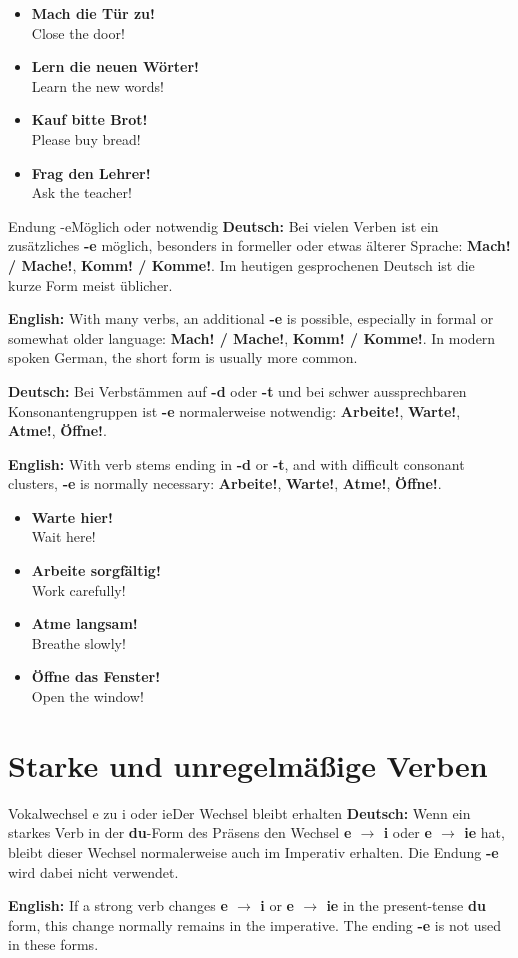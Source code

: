 \documentclass[a4paper,11pt]{article}
\newcommand{\GermanText}[1]{\textbf{Deutsch: }#1\par}
\newcommand{\EnglishText}[1]{{\small\color{SoftGray}\textbf{English: }#1\par}}
\newcommand{\ExampleItem}[2]{\item \textbf{#1}\\{\small\color{SoftGray}#2}}
\begin{document}
        \begin{exbox}
            \begin{itemize}
                \ExampleItem{Mach die Tür zu!}{Close the door!}
                \ExampleItem{Lern die neuen Wörter!}{Learn the new words!}
                \ExampleItem{Kauf bitte Brot!}{Please buy bread!}
                \ExampleItem{Frag den Lehrer!}{Ask the teacher!}
            \end{itemize}
        \end{exbox}

        \begin{grammarentry}{Endung -e}{Möglich oder notwendig}
            \GermanText{Bei vielen Verben ist ein zusätzliches \textbf{-e} möglich, besonders in formeller oder etwas älterer Sprache: \textbf{Mach! / Mache!}, \textbf{Komm! / Komme!}. Im heutigen gesprochenen Deutsch ist die kurze Form meist üblicher.}
            \EnglishText{With many verbs, an additional \textbf{-e} is possible, especially in formal or somewhat older language: \textbf{Mach! / Mache!}, \textbf{Komm! / Komme!}. In modern spoken German, the short form is usually more common.}

            \GermanText{Bei Verbstämmen auf \textbf{-d} oder \textbf{-t} und bei schwer aussprechbaren Konsonantengruppen ist \textbf{-e} normalerweise notwendig: \textbf{Arbeite!}, \textbf{Warte!}, \textbf{Atme!}, \textbf{Öffne!}.}
            \EnglishText{With verb stems ending in \textbf{-d} or \textbf{-t}, and with difficult consonant clusters, \textbf{-e} is normally necessary: \textbf{Arbeite!}, \textbf{Warte!}, \textbf{Atme!}, \textbf{Öffne!}.}
        \end{grammarentry}

        \begin{exbox}
            \begin{itemize}
                \ExampleItem{Warte hier!}{Wait here!}
                \ExampleItem{Arbeite sorgfältig!}{Work carefully!}
                \ExampleItem{Atme langsam!}{Breathe slowly!}
                \ExampleItem{Öffne das Fenster!}{Open the window!}
            \end{itemize}
        \end{exbox}

    \section{Starke und unregelmäßige Verben}

        \begin{grammarentry}{Vokalwechsel e zu i oder ie}{Der Wechsel bleibt erhalten}
            \GermanText{Wenn ein starkes Verb in der \textbf{du}-Form des Präsens den Wechsel \textbf{e $\rightarrow$ i} oder \textbf{e $\rightarrow$ ie} hat, bleibt dieser Wechsel normalerweise auch im Imperativ erhalten. Die Endung \textbf{-e} wird dabei nicht verwendet.}
            \EnglishText{If a strong verb changes \textbf{e $\rightarrow$ i} or \textbf{e $\rightarrow$ ie} in the present-tense \textbf{du} form, this change normally remains in the imperative. The ending \textbf{-e} is not used in these forms.}
        \end{grammarentry}
\end{document}
